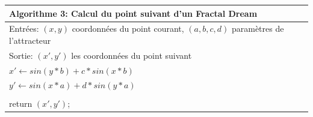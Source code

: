 \documentclass[11pt,francais]{article}
\begin{document}
\begin{table}[hb]
  \begin{tabular}{l}
  \hline
  Algorithme 3: Calcul du point suivant d'un Fractal Dream\tabularnewline
  \hline
  Entrées: \((x, y)\) coordonnées du point courant, \((a, b, c, d)\) paramètres de l'attracteur \tabularnewline
  Sortie: \((x', y')\) les coordonnées du point suivant\tabularnewline
  \hline
  \(x' \leftarrow sin(y*b)+c*sin(x*b)\)\tabularnewline
  \(y' \leftarrow sin(x*a)+d*sin(y*a)\)\tabularnewline
  \tabularnewline
  return \((x', y')\);\tabularnewline
  \hline
  \end{tabular}
  \label{tab:tab3}
\end{table}

\end{document}
